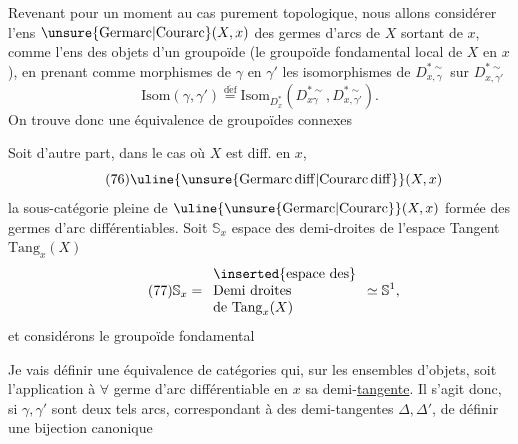 Revenant pour un moment au cas purement topologique, nous allons considérer l'ens $\unsure{\mathrm{Germarc}|\mathrm{Courarc}}(X,x)$ des germes d'arcs de $X$ sortant de $x$, comme l'ens des objets d'un groupoïde (le groupoïde fondamental local de $X$ en $x$), en prenant comme morphismes de $\gamma$ en $\gamma'$  les isomorphismes de  $D_{x,\gamma}^{*\sim}$ sur $D_{x,\gamma'}^{*\sim}$
\[
\tag{74}
\mathrm{Isom}(\gamma,\gamma')\overset{\mathrm{d\acute ef}}{=}
\mathrm{Isom}_{D_x^*}(D_{x\gamma}^{*\sim},D_{x,\gamma'}^{*\sim}).
\]
On trouve donc  une équivalence de  groupoïdes connexes


Soit d'autre part, dans le cas où $X$ est diff. en $x$, 
\[
\tag{76}
\uline{\unsure{\mathrm{Germarc\,diff}|\mathrm{Courarc\,diff}}}(X,x)
\]
la sous-catégorie pleine de  $\uline{\unsure{\mathrm{Germarc}|\mathrm{Courarc}}}(X,x)$ formée des germes d'arc différentiables. Soit $\mathbb S_x$  espace des demi-droites de l'espace Tangent $\mathrm{Tang}_x(X)$
\[
\tag{77}
\mathbb S_x=
\begin{array}{l}
\inserted{\text{espace des}}\\
\text{Demi droites}\\
\text{de }\mathrm{Tang}_x(X)
\end{array}
\simeq\mathbb S^1,
\]
et considérons le groupoïde fondamental

Je vais définir une équivalence de catégories
qui, sur les ensembles d'objets, soit l'application  à $\forall$ germe d'arc différentiable en $x$ sa demi-\uline{tangente}. Il s'agit donc, si $\gamma,\gamma'$ sont deux tels arcs, correspondant à des demi-tangentes $\Delta,\Delta'$, de définir une bijection canonique


